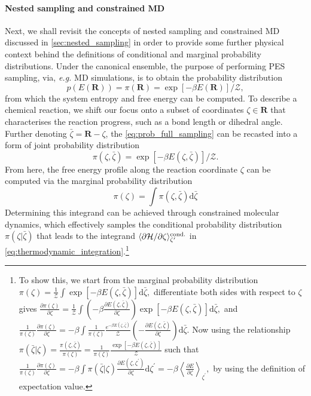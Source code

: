 \paragraph{\textbf{Nested sampling and constrained MD}}
Next, we shall revisit the concepts of nested sampling and constrained MD discussed in \cref{sec:nested_sampling} in order to provide some further physical context behind the definitions of conditional and marginal probability distributions. Under the canonical ensemble, the purpose of performing PES sampling, via, \emph{e.g.} MD simulations, is to obtain the probability distribution 
\begin{equation}
    \label{eq:prob_full_sampling}
p(E(\bm{R}))=\pi(\bm{R})= \exp[-\beta E(\bm{R})]/\mathcal{Z},
\end{equation} 
from which the system entropy and free energy can be computed. To describe a chemical reaction, we shift our focus onto a subset of coordinates $\zeta\in\bm{R}$ that characterises the reaction progress, such as a bond length or dihedral angle. Further denoting $\bar{\zeta}=\bm{R}-\zeta$, the \cref{eq:prob_full_sampling} can be recasted into a form of joint probability distribution 
\begin{equation}
    \label{eq:joint_prob_full_sampling}
\pi(\zeta,\bar{\zeta})= \exp[-\beta E(\zeta,\bar{\zeta})]/\mathcal{Z}.
\end{equation} 
From here, the free energy profile along the reaction coordinate $\zeta$ can be computed via the marginal probability distribution
\begin{equation}    
\label{eq:marginal_prob_sampling}
\pi(\zeta)=\int \pi(\zeta,\bar{\zeta}) \mbox{d}\bar{\zeta}
\end{equation}
Determining this integrand can be achieved through constrained molecular dynamics, which effectively samples the conditional probability distribution $\pi(\zeta|\bar{\zeta})$ that leads to the integrand $\langle \partial\mathcal{H}/\partial {\zeta}\rangle_{\zeta^\prime}^{\mbox{\scriptsize{cond.}}}$ in \cref{eq:thermodynamic_integration}.\footnote{To show this, we start from the marginal probability distribution
$
    \pi(\zeta)=\frac{1}{\mathcal{Z}}\int\exp\left[-\beta E(\zeta,\bar{\zeta})\right]\mbox{d}\bar{\zeta},
$
differentiate both sides with respect to $\zeta$ gives
$
    \frac{\partial\pi(\zeta)}{\partial\zeta}=\frac{1}{\mathcal{Z}}\int\left(-\beta\frac{\partial E(\zeta,\bar{\zeta})}{\partial \zeta}\right)\exp\left[-\beta E(\zeta,\bar{\zeta})\right]\mbox{d}\bar{\zeta},
$
and 
$
    \frac{1}{\pi(\zeta)}\frac{\partial\pi(\zeta)}{\partial\zeta}=-\beta\int\frac{1}{\pi(\zeta)}\frac{e^{-\beta E(\zeta,\bar{\zeta})}}{\mathcal{Z}}\left(-\frac{\partial E(\zeta,\bar{\zeta})}{\partial \zeta}\right)\mbox{d}\bar{\zeta}.
$
Now using the relationship 
$
\pi(\bar{\zeta}|\zeta)=\frac{\pi(\zeta,\bar{\zeta})}{\pi(\zeta)}=\frac{1}{\pi(\zeta)}\frac{\exp\left[-\beta E(\zeta,\bar{\zeta})\right]}{\mathcal{Z}}
$
such that 
$
    \frac{1}{\pi(\zeta)}\frac{\partial\pi(\zeta)}{\partial\zeta}=-\beta\int\pi(\bar{\zeta}|\zeta) \frac{\partial E(\zeta,\zeta^\prime)}{\partial \zeta}\mbox{d}\zeta^\prime=-\beta\left\langle \frac{\partial E}{\partial\zeta}\right\rangle_{\zeta^\prime},
$
by using the definition of expectation value.
}


